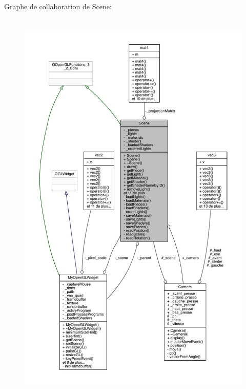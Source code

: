 Graphe de collaboration de Scene\+:
\nopagebreak
\begin{figure}[H]
\begin{center}
\leavevmode
\includegraphics[height=550pt]{class_scene__coll__graph}
\end{center}
\end{figure}
